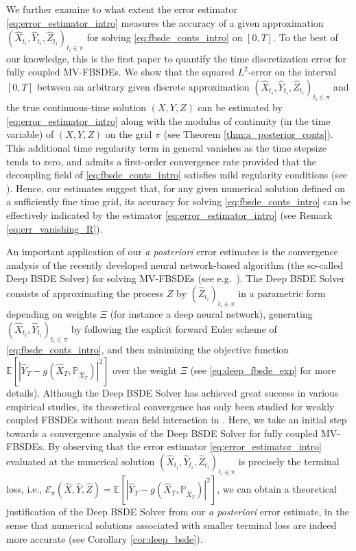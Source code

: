 \documentclass[11pt]{article}
\numberwithin{equation}{section}
\theoremstyle{definition}
\theoremstyle{remark}
\def\cE{\mathcal{E}}
\def\sE{{\mathbb{E}}}
\def\sP{\mathbb{P}}
\begin{document}
We further examine to what extent the error estimator \eqref{eq:error_estimator_intro}  
 measures the  accuracy of a given  approximation $(\hat{X}_{t_i},\hat{Y}_{t_i},\hat{Z}_{t_i})_{t_i\in \pi}$ 
 for solving \eqref{eq:fbsde_conts_intro} on $[0,T]$.
  To the best of our knowledge, this is the  first paper to
quantify the time discretization error for fully coupled MV-FBSDEs.
We show that 
the squared $L^2$-error 
on the  interval $[0,T]$
between 
an arbitrary given discrete approximation
$(\hat{X}_{t_i},\hat{Y}_{t_i},\hat{Z}_{t_i})_{t_i\in \pi}$ 
and the true continuous-time solution $(X,Y,Z)$
can be estimated by \eqref{eq:error_estimator_intro}  along with 
the  modulus of continuity (in the time variable)
of $(X,Y,Z)$ on the grid $\pi$ (see Theorem \ref{thm:a_posterior_conts}).
This additional time regularity term in general vanishes as the time stepsize tends to zero,
and admits a first-order convergence rate provided that 
the decoupling field of \eqref{eq:fbsde_conts_intro}
satisfies mild regularity conditions
 (see \cite{chassagneux2019}).
Hence, our estimates suggest that,
for any given numerical solution defined on a sufficiently fine time grid,
its  accuracy for solving  \eqref{eq:fbsde_conts_intro}
 can be effectively indicated by the estimator \eqref{eq:error_estimator_intro}
 (see Remark \ref{eq:err_vanishing_R}).

An important application of
our \textit{a posteriori} error estimates
is the convergence analysis of 
the recently developed neural network-based algorithm (the  so-called Deep BSDE Solver)
for solving MV-FBSDEs (see e.g.~\cite{carmona2019,  fouque2019,germain2019}).
The Deep BSDE Solver consists of approximating the process $Z$ 
by  $(\hat{Z}_{t_i})_{t_i\in \pi}$
in a parametric form depending on  weights $\Xi$ (for instance a deep neural network),
generating  $(\hat{X}_{t_i},\hat{Y}_{t_i})_{t_i\in \pi}$ 
by following the explicit  forward Euler scheme of \eqref{eq:fbsde_conts_intro},
and  then minimizing the objective function 
$\sE[|\hat{Y}_T-g(\hat{X}_T,\sP_{\hat{X}_T})|^2]$
 over the weight $\Xi$
 (see \eqref{eq:deep_fbsde_exp} for more details). 
 Although the Deep BSDE Solver 
 has  achieved   great success in  various empirical studies,
 its theoretical convergence has only been studied 
 for weakly coupled FBSDEs without mean field interaction in \cite{han2018}.
 Here, we take an initial step towards
 a convergence analysis of the Deep BSDE Solver for  fully coupled MV-FBSDEs.
By observing that the error estimator \eqref{eq:error_estimator_intro}  evaluated 
at the 
numerical solution $(\hat{X}_{t_i},\hat{Y}_{t_i},\hat{Z}_{t_i})_{t_i\in \pi}$ 
is precisely the terminal loss, i.e., 
$\cE_\pi(\hat{X},\hat{Y},\hat{Z})
=
\sE[|\hat{Y}_T-g(\hat{X}_T,\sP_{\hat{X}_T})|^2]$,
we can 
 obtain a theoretical justification of the Deep BSDE Solver 
from our \textit{a posteriori} error estimate,
in the sense that 
numerical
solutions associated with smaller terminal loss are  indeed more accurate (see Corollary \ref{cor:deep_bsde}).
\end{document}
